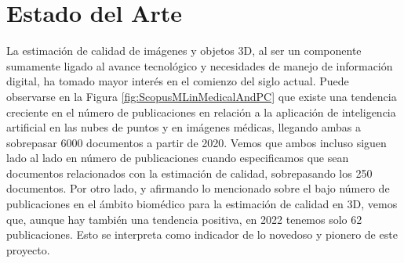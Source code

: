 \chapter{Estado del Arte}
\label{sec:EstadoDelArte}
La estimación de calidad de imágenes y objetos 3D, al ser un componente sumamente 
ligado al avance tecnológico y necesidades de manejo de información digital, ha 
tomado mayor interés en el comienzo del siglo actual.
Puede observarse en la Figura \ref{fig:ScopusMLinMedicalAndPC} que existe 
una tendencia creciente en el número de publicaciones en relación a la aplicación 
de inteligencia artificial en las nubes de puntos y en imágenes médicas, llegando
ambas a sobrepasar 6000 documentos a partir de 2020.  Vemos que ambos incluso siguen 
lado al lado en número de publicaciones cuando especificamos que sean documentos 
relacionados con la estimación de calidad, sobrepasando los 250 documentos. 
Por otro lado, y afirmando lo mencionado sobre el bajo número de publicaciones 
en el ámbito biomédico para la estimación de calidad en 3D, vemos que, aunque hay
también una tendencia positiva, en 2022 tenemos solo 62 publicaciones. Esto 
se interpreta como indicador de lo novedoso y pionero de este proyecto.
